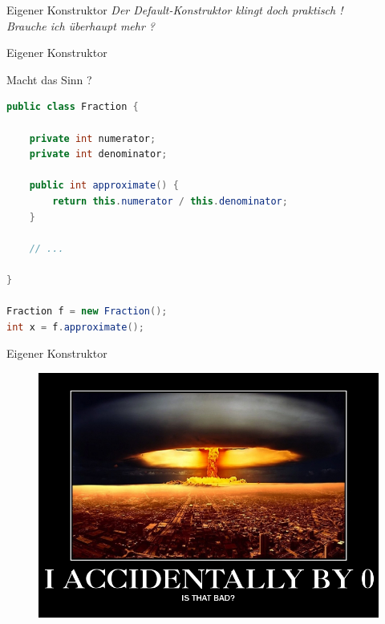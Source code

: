 \documentclass[18pt]{beamer}
\begin{document}
\begin{frame}{Eigener Konstruktor}
    \textit{Der Default-Konstruktor klingt doch praktisch !\\ Brauche ich überhaupt mehr ?}
\end{frame}

\begin{frame}[fragile]{Eigener Konstruktor}
    \begin{exampleblock}{Macht das Sinn ?}
        \begin{lstlisting}[language=Java,basicstyle=\scriptsize]
public class Fraction {

    private int numerator;
    private int denominator;

    public int approximate() {
        return this.numerator / this.denominator;
    }

    // ...

}

Fraction f = new Fraction();
int x = f.approximate();
        \end{lstlisting}

    \end{exampleblock}
\end{frame}

\begin{frame}{Eigener Konstruktor}
    \begin{figure}
        \includegraphics[scale=0.32]{img/iaccidentallyby0.jpg}
    \end{figure}
\end{frame}
\end{document}
